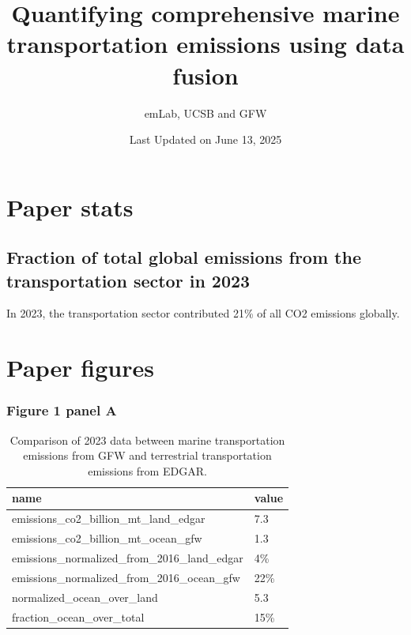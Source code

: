 \documentclass[
  letterpaper,
  DIV=11,
  numbers=noendperiod]{scrartcl}
\title{Quantifying comprehensive marine transportation emissions using
data fusion}
\author{emLab, UCSB and GFW}
\date{Last Updated on June 13, 2025}
\renewcommand*\contentsname{Table of contents}
\newcommand\contentsname{Table of contents}
\begin{document}
\maketitle

\renewcommand*\contentsname{Table of contents}
{
\hypersetup{linkcolor=}
\setcounter{tocdepth}{3}
\tableofcontents
}

\section{Paper stats}\label{paper-stats}

\subsection{Fraction of total global emissions from the transportation
sector in
2023}\label{fraction-of-total-global-emissions-from-the-transportation-sector-in-2023}

In 2023, the transportation sector contributed 21\% of all CO2 emissions
globally.

\section{Paper figures}\label{paper-figures}

\subsubsection{Figure 1 panel A}\label{figure-1-panel-a}

\begin{longtable}[]{@{}ll@{}}

\caption{\label{tbl-summary-stat-comparison-2023-gfw-edgar}Comparison of
2023 data between marine transportation emissions from GFW and
terrestrial transportation emissions from EDGAR.}

\tabularnewline

\toprule\noalign{}
name & value \\
\midrule\noalign{}
\endhead
\bottomrule\noalign{}
\endlastfoot
emissions\_co2\_billion\_mt\_land\_edgar & 7.3 \\
emissions\_co2\_billion\_mt\_ocean\_gfw & 1.3 \\
emissions\_normalized\_from\_2016\_land\_edgar & 4\% \\
emissions\_normalized\_from\_2016\_ocean\_gfw & 22\% \\
normalized\_ocean\_over\_land & 5.3 \\
fraction\_ocean\_over\_total & 15\% \\

\end{longtable}
\end{document}

